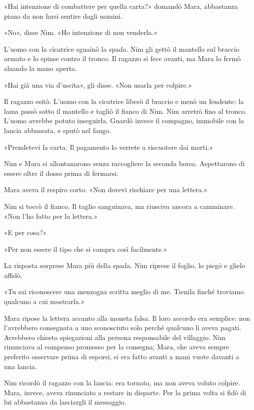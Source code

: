 \documentclass[10pt,a4paper]{article}
\begin{document}
«Hai intenzione di combattere per quella carta?» domandò Mara, abbastanza piano da non farsi sentire dagli uomini.

«No», disse Nim. «Ho intenzione di non venderla.»

L'uomo con la cicatrice sguainò la spada. Nim gli gettò il mantello sul braccio armato e lo spinse contro il tronco. Il ragazzo si fece avanti, ma Mara lo fermò alzando la mano aperta.

«Hai già una via d'uscita», gli disse. «Non usarla per colpire.»

Il ragazzo esitò. L'uomo con la cicatrice liberò il braccio e menò un fendente: la lama passò sotto il mantello e tagliò il fianco di Nim. Nim arretrò fino al tronco. L'uomo avrebbe potuto inseguirla. Guardò invece il compagno, immobile con la lancia abbassata, e sputò nel fango.

«Prendetevi la carta. Il pagamento lo verrete a riscuotere dai morti.»

Nim e Mara si allontanarono senza raccogliere la seconda borsa. Aspettarono di essere oltre il dosso prima di fermarsi.

Mara aveva il respiro corto. «Non dovevi rischiare per una lettera.»

Nim si toccò il fianco. Il taglio sanguinava, ma riusciva ancora a camminare. «Non l'ho fatto per la lettera.»

«E per cosa?»

«Per non essere il tipo che si compra così facilmente.»

La risposta sorprese Mara più della spada. Nim riprese il foglio, lo piegò e glielo affidò.

«Tu sai riconoscere una menzogna scritta meglio di me. Tienila finché troviamo qualcuno a cui mostrarla.»

Mara ripose la lettera accanto alla moneta falsa. Il loro accordo era semplice: non l'avrebbero consegnata a uno sconosciuto solo perché qualcuno li aveva pagati. Avrebbero chiesto spiegazioni alla persona responsabile del villaggio. Nim rinunciava al compenso promesso per la consegna; Mara, che aveva sempre preferito osservare prima di esporsi, si era fatto avanti a mani vuote davanti a una lancia.

Nim ricordò il ragazzo con la lancia: era tornato, ma non aveva voluto colpire. Mara, invece, aveva rinunciato a restare in disparte. Per la prima volta si fidò di lui abbastanza da lasciargli il messaggio.
\end{document}

